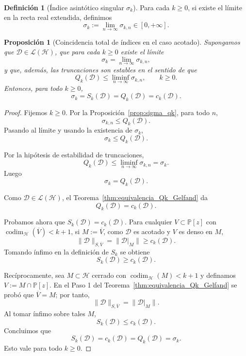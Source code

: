 \documentclass[12pt,a4paper]{article}
\newtheorem{proposition}{Proposición}
\theoremstyle{definition}
\newtheorem{definition}{Definición}
\theoremstyle{remark}
\newcommand{\Poly}{\mathbb{P}[z]}
\newcommand{\D}{\mathcal{D}}
\begin{document}
\begin{definition}[Índice asintótico singular $\sigma_k$]\label{def:indice_Sigma_k}
  Para cada $k\ge 0$, si existe el límite en la recta real extendida, definimos
  \[
    \sigma_k := \lim_{n\to\infty} \sigma_{k,n} \in [0,+\infty].
  \]
\end{definition}

\begin{proposition}[Coincidencia total de índices en el caso acotado]\label{prop:coincidencia_total_acotado_pendiente}
  Supongamos que $\D\in\mathcal{L}(\mathcal{H})$, que para cada $k\ge0$ existe el límite
  \[
    \sigma_k=\lim_{n\to\infty}\sigma_{k,n},
  \]
  y que, además, las truncaciones son estables en el sentido de que
  \[
    Q_k(\D)\le \liminf_{n\to\infty}\sigma_{k,n},
    \qquad k\ge0.
  \]
  Entonces, para todo $k\ge0$,
  \[
    \sigma_k=S_k(\D)=Q_k(\D)=c_k(\D).
  \]
\end{proposition}

\begin{proof}
  Fijemos $k\ge 0$. Por la Proposición~\ref{prop:sigma_qk}, para todo $n$,
  \[
    \sigma_{k,n}\le Q_k(\D).
  \]
  Pasando al límite y usando la existencia de $\sigma_k$,
  \[
    \sigma_k\le Q_k(\D).
  \]

  Por la hipótesis de estabilidad de truncaciones,
  \[
    Q_k(\D)\le \liminf_{n\to\infty}\sigma_{k,n}=\sigma_k.
  \]
  Luego
  \[
    \sigma_k=Q_k(\D).
  \]

  Como $\D\in\mathcal L(\mathcal H)$, el Teorema~\ref{thm:equivalencia_Qk_Gelfand} da
  \[
    Q_k(\D)=c_k(\D).
  \]

  Probamos ahora que $S_k(\D)=c_k(\D)$. Para cualquier
  $V\subset\Poly$ con $\operatorname{codim}_{\mathcal H}(\overline V)<k+1$, si
  $M:=\overline V$, como $\D$ es acotado y $V$ es denso en $M$,
  \[
    \|\D\|_{S,\overline V}=\|\D|_M\|\ge c_k(\D).
  \]
  Tomando ínfimo en la definición de $S_k$ se obtiene
  \[
    S_k(\D)\ge c_k(\D).
  \]

  Recíprocamente, sea $M\subset\mathcal H$ cerrado con
  $\operatorname{codim}_{\mathcal H}(M)<k+1$ y definamos
  $V:=M\cap\Poly$. En el Paso 1 del
  Teorema~\ref{thm:equivalencia_Qk_Gelfand} se probó que $\overline V=M$; por tanto,
  \[
    \|\D\|_{S,\overline V}=\|\D|_M\|.
  \]
  Al tomar ínfimo sobre tales $M$,
  \[
    S_k(\D)\le c_k(\D).
  \]
  Concluimos que
  \[
    S_k(\D)=c_k(\D)=Q_k(\D)=\sigma_k.
  \]
  Esto vale para todo $k\ge0$.
\end{proof}
\end{document}

